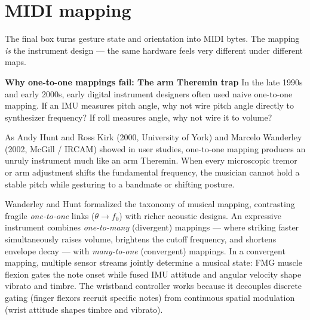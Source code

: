 \section{MIDI mapping}
\label{ch41:midi}

The final box turns gesture state and orientation into MIDI bytes. The mapping
\emph{is} the instrument design --- the same hardware feels very different
under different maps.

\begin{intuitionbox}
\textbf{Why one-to-one mappings fail: The arm Theremin trap}
In the late 1990s and early 2000s, early digital instrument designers often used naive one-to-one mapping. If an IMU measures pitch angle, why not wire pitch angle directly to synthesizer frequency? If roll measures angle, why not wire it to volume?

As Andy Hunt and Ross Kirk (2000, University of York) and Marcelo Wanderley (2002, McGill / IRCAM) showed in user studies, one-to-one mapping produces an unruly instrument much like an arm Theremin. When every microscopic tremor or arm adjustment shifts the fundamental frequency, the musician cannot hold a stable pitch while gesturing to a bandmate or shifting posture.

Wanderley and Hunt formalized the taxonomy of musical mapping, contrasting fragile \emph{one-to-one} links ($\theta \to f_0$) with richer acoustic designs. An expressive instrument combines \emph{one-to-many} (divergent) mappings --- where striking faster simultaneously raises volume, brightens the cutoff frequency, and shortens envelope decay --- with \emph{many-to-one} (convergent) mappings. In a convergent mapping, multiple sensor streams jointly determine a musical state: FMG muscle flexion gates the note onset while fused IMU attitude and angular velocity shape vibrato and timbre. The wristband controller works because it decouples discrete gating (finger flexors recruit specific notes) from continuous spatial modulation (wrist attitude shapes timbre and vibrato).
\end{intuitionbox}

